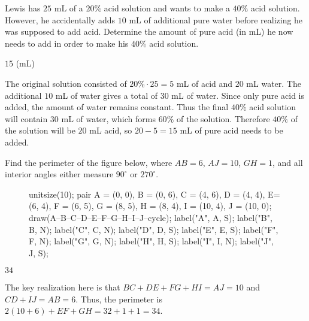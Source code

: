 \documentclass[11pt]{article}
\begin{document}
\begin{problem}
Lewis has $25$ mL of a $20\%$ acid solution and wants to make a $40\%$ acid solution. However, he accidentally adds $10$ mL of additional pure water before realizing he was supposed to add acid. Determine the amount of pure acid (in mL) he now needs to add in order to make his $40\%$ acid solution.
\end{problem}

\begin{answer}
$\boxed{15}$ (mL)
\end{answer}

\begin{solution}
The original solution consisted of $20\% \cdot 25 = 5$ mL of acid and $20$ mL water. The additional $10$ mL of water gives a total of $30$ mL of water. Since only pure acid is added, the amount of water remains constant. Thus the final $40\%$ acid solution will contain $30$ mL of water, which forms $60\%$ of the solution. Therefore $40\%$ of the solution will be $20$ mL acid, so $20 - 5 = \boxed{15}$ mL of pure acid needs to be added.
\end{solution}


\begin{problem}%
Find the perimeter of the figure below, where $AB = 6$, $AJ = 10$, $GH = 1$, and all interior angles either measure $90^\circ$ or $270^\circ$.
\begin{figure}[h]
	\begin{center}
		\begin{asy}
		unitsize(10);
		pair A = (0, 0), B = (0, 6), C = (4, 6), D = (4, 4), E= (6, 4), F = (6, 5), G = (8, 5), H = (8, 4), I = (10, 4), J = (10, 0);
		draw(A--B--C--D--E--F--G--H--I--J--cycle);
		label("A", A, S);
		label("B", B, N);
		label("C", C, N);
		label("D", D, S);
		label("E", E, S);
		label("F", F, N);
		label("G", G, N);
		label("H", H, S);
		label("I", I, N);
		label("J", J, S);
		\end{asy}
	\end{center}
\end{figure}
\end{problem}

\begin{answer}
$\boxed{34}$
\end{answer}

\begin{solution}
The key realization here is that $BC+DE+FG+HI = AJ = 10$ and $CD+IJ = AB = 6$. Thus, the perimeter is $2(10+6) + EF+GH=32 + 1 + 1 = \boxed{34}$.
\end{solution}
\end{document}
